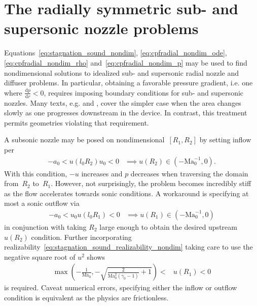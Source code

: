 \documentclass[letterpaper,11pt,nointlimits,reqno]{amsart}
\newcommand{\Mach}[1][]{\mbox{Ma}_{#1}}
\begin{document}
\section{The radially symmetric sub- and supersonic nozzle problems}

Equations~\eqref{eq:stagnation_sound_nondim}, \eqref{eq:cpfradial_nondim_ode},
\eqref{eq:cpfradial_nondim_rho} and~\eqref{eq:cpfradial_nondim_p} may be used
to find nondimensional solutions to idealized sub- and supersonic radial nozzle
and diffuser problems.  In particular, obtaining a favorable pressure gradient,
i.e. one where $\frac{\mathrm{d}p}{\mathrm{d}r} < 0$, requires imposing
boundary conditions for sub- and supersonic nozzles.  Many texts, e.g.
\citet[\textsection{}9.4]{White1999Fluid} and
\citet[\textsection{}97]{Landau2004Fluid}, cover the simpler case when the area
changes slowly as one progresses downstream in the device.  In contrast, this
treatment permits geometries violating that requirement.

A subsonic nozzle may be posed on nondimensional~$\left[R_{1}, R_{2}\right]$ by
setting inflow per
\begin{align}
    -a_0 < u\!\left(l_0 R_{2}\right) u_0 < 0
    &\implies
    u\!\left(R_{2}\right) \in \left(-\Mach[0]^{-1}, 0\right)
.
\end{align}
With this condition, $-u$ increases and $p$ decreases when traversing the
domain from~$R_{2}$ to~$R_{1}$.  However, not surprisingly, the problem becomes
incredibly stiff as the flow accelerates towards sonic conditions.  A
workaround is specifying at most a sonic outflow via
\begin{align}
    -a_0 < u_0 u\!\left(l_0 R_1\right) < 0
    &\implies
    u\!\left(R_1\right) \in \left(-\Mach[0]^{-1}, 0\right)
\end{align}
in conjunction with taking $R_{2}$ large enough to obtain the desired upstream
$u\!\left(R_{2}\right)$ condition.  Further incorporating
realizability~\eqref{eq:stagnation_sound_realizability_nondim} taking care to
use the negative square root of $u^2$ shows
\begin{align}
  \max\left(
    -\frac{1}{\Mach[0]}, -\sqrt{\frac{2}{\Mach[0]^2\left(\gamma_0-1\right)}+1}
  \right) < &u\!\left(R_1\right) < 0
\label{eq:cpfradial_nozzle_subsonic_bc}
\end{align}
is required.  Caveat numerical errors, specifying either the inflow or outflow
condition is equivalent as the physics are frictionless.
\end{document}
